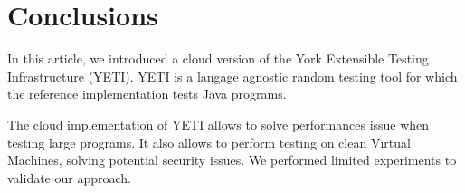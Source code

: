 \section{Conclusions}\label{sec:conc}
In this article, we introduced a cloud version of the York 
Extensible Testing Infrastructure (YETI). YETI is a langage 
agnostic random testing tool for which the reference 
implementation tests Java programs. 

The cloud implementation of YETI allows to solve performances 
issue when testing large programs. It also allows
to perform testing on clean Virtual Machines, solving potential 
security issues. We performed limited experiments to validate 
our approach. 
